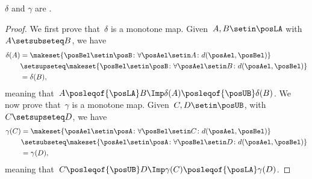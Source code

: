 \begin{lemma}
    \label{lem:deltagammamonotone}
    $\delta$ and $\gamma$ are .
\end{lemma}
\begin{proof}
    We first prove that~$\delta$ is a monotone map.
    Given~$A,B\setin \posLA$ with~$A\setsubseteq B$, we have
    \begin{equation}
        \begin{aligned}
            \delta(A) & =\makeset{\posBel\setin \posB\colon \forall \posAel \setin A\colon d(\posAel,\posBel)} \\
                      & \setsupseteq \makeset{\posBel\setin \posB\colon \forall \posAel\setin B \colon d(\posAel,\posBel)} \\
                      & =\delta(B),
        \end{aligned}
    \end{equation}
    meaning that~$A\posleqof{\posLA} B \Imp \delta(A)\posleqof{\posUB} \delta(B)$.
    We now prove that~$\gamma$ is a monotone map.
    Given~$C,D\setin \posUB$, with~$C\setsupseteq D$, we have
    \begin{equation}
        \begin{aligned}
            \gamma(C) & =\makeset{\posAel\setin \posA\colon \forall \posBel \setin C\colon d(\posAel,\posBel)} \\
                      & \setsubseteq \makeset{\posAel\setin \posA\colon \forall \posBel \setin D \colon d(\posAel,\posBel)} \\
                      & =\gamma(D),
        \end{aligned}
    \end{equation}
    meaning that~$C\posleqof{\posUB} D \Imp \gamma(C)\posleqof{\posLA} \gamma(D)$.
\end{proof}

